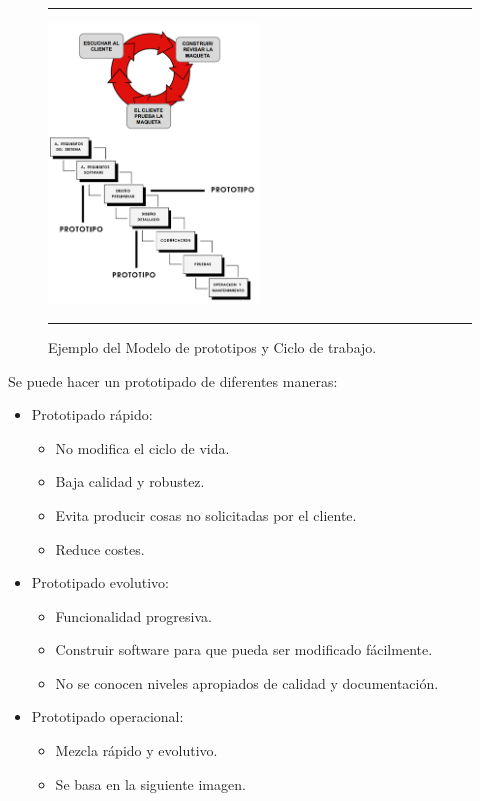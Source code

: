 \begin{figure}[h]
\hrule\smallskip
\begin{center}
\includegraphics[width=0.5\textwidth]{fig/prototipo.png}
\end{center}
\caption{Ejemplo del Modelo de prototipos y Ciclo de trabajo.}
\label{fig:prototipos}
\hrule
\end{figure}

Se puede hacer un prototipado de diferentes maneras:
\begin{itemize}
\item Prototipado rápido:
  \begin{itemize}
  \item No modifica el ciclo de vida.
  \item Baja calidad y robustez.
  \item Evita producir cosas no solicitadas por el cliente.
  \item Reduce costes.
  \end{itemize}
\item Prototipado evolutivo:
  \begin{itemize}
  \item Funcionalidad progresiva.
  \item Construir software para que pueda ser modificado fácilmente.
  \item No se conocen niveles apropiados de calidad y documentación.
  \end{itemize}
\item Prototipado operacional:
  \begin{itemize}
  \item Mezcla rápido y evolutivo.
  \item Se basa en la siguiente imagen.
  \end{itemize}
\end{itemize}



